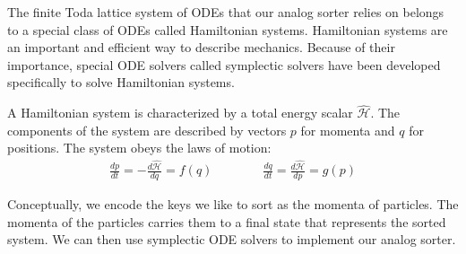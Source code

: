\newcommand*{\hham}{\hat{\mathcal{H}}}
The finite Toda lattice system of ODEs that our analog sorter relies on belongs to a special class of ODEs called Hamiltonian systems.
Hamiltonian systems are an important and efficient way to describe mechanics.
Because of their importance, special ODE solvers called symplectic solvers have been developed specifically to solve Hamiltonian systems.

A Hamiltonian system is characterized by a total energy scalar $\hham$.
The components of the system are described by vectors $p$ for momenta and $q$ for positions.
The system obeys the laws of motion:
\begin{align}
\frac{dp}{dt} = -\frac{d\hham}{dq} = f(q) \qquad \qquad
\frac{dq}{dt} = \frac{d\hham}{dp} = g(p)
\end{align}

Conceptually, we encode the keys we like to sort as the momenta of particles.
The momenta of the particles carries them to a final state that represents the sorted system.
We can then use symplectic ODE solvers to implement our analog sorter.
